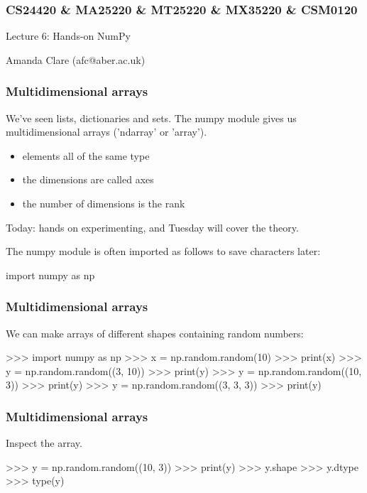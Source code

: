 \documentclass{beamer}
\begin{document}

\begin{frame}
\frametitle{CS24420 \& MA25220 \& MT25220 \& MX35220 \& CSM0120}

\begin{center}
\begin{huge}
Lecture 6: Hands-on NumPy
\end{huge}
\bigskip

Amanda Clare (afc@aber.ac.uk)

\end{center}
\end{frame}


\begin{frame}[fragile]
\frametitle{Multidimensional arrays}
We've seen lists, dictionaries and sets. The numpy module gives us
multidimensional arrays ('ndarray' or 'array').  

\begin{itemize}
\item elements all of the same type
\item the dimensions are called axes
\item the number of dimensions is the rank 
\end{itemize}

\bigskip

Today: hands on
experimenting, and Tuesday will cover the theory.

\bigskip

The numpy module is often imported as follows to save characters later:
\begin{code}
import numpy as np
\end{code}

\end{frame}



\begin{frame}[fragile]
\frametitle{Multidimensional arrays}
We can make arrays of different shapes containing random numbers:
\begin{code}
>>> import numpy as np
>>> x = np.random.random(10)
>>> print(x)
>>> y = np.random.random((3, 10))
>>> print(y)
>>> y = np.random.random((10, 3))
>>> print(y)
>>> y = np.random.random((3, 3, 3))
>>> print(y)
\end{code}
\end{frame}

\begin{frame}[fragile]
\frametitle{Multidimensional arrays}
Inspect the array. 
\begin{code}
>>> y = np.random.random((10, 3))
>>> print(y)
>>> y.shape
>>> y.dtype
>>> type(y)
\end{code}
\end{frame}
\end{document}
